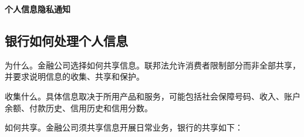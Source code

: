 \documentclass[UTF8,fontset=none,11pt,a4paper]{ctexart}
\begin{document}
{\noindent\fontsize{20}{25}\selectfont\bfseries 个人信息隐私通知\par}
\vspace{10pt}
\subsection*{银行如何处理个人信息}
为什么。金融公司选择如何共享信息。联邦法允许消费者限制部分而非全部共享，并要求说明信息的收集、共享和保护。


收集什么。具体信息取决于所用产品和服务，可能包括社会保障号码、收入、账户余额、付款历史、信用历史和信用分数。


如何共享。金融公司须共享信息开展日常业务，银行的共享如下：
\end{document}
